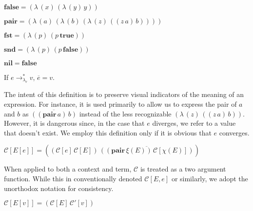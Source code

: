 \documentclass[ms,electronic,twosidetoc,letterpaper,chaptercenter,parttop]{byumsphd}
\newcommand{\true}{\mathbf{true}}
\newcommand{\false}{\mathbf{false}}
\newcommand{\nil}{\mathbf{nil}}
\newcommand{\pair}[2]{((\mathbf{pair}\,#1)\,#2)}
\newcommand{\eval}[1]{\overline{#1}}
\newcommand{\lvrrs}{\rightarrow_{\lambda_v}^{*}}
\newcommand{\C}[1]{\mathcal{C}[#1]}
\newcommand{\Ct}[2]{\mathcal{C}[#1,#2]}
\newcommand{\Cp}[1]{\mathcal{C}'[#1]}
\newcommand{\abs}[2]{(\lambda\,(#1)\,#2)}
\newcommand{\app}[2]{(#1\,#2)}
\begin{document}
\begin{defn}
$\false=\abs{x}{\abs{y}{y}}$
\end{defn}

\begin{defn}
$\mathbf{pair}=\abs{a}{\abs{b}{\abs{z}{\app{\app{z}{a}}{b}}}}$
\end{defn}

\begin{defn}
$\mathbf{fst}=\abs{p}{\app{p}{\true}}$
\end{defn}

\begin{defn}
$\mathbf{snd}=\abs{p}{\app{p}{\false}}$
\end{defn}

\begin{defn}
$\nil=\false$
\end{defn}

\begin{defn}
If $e\lvrrs v$, $\eval{e}=v$.

The intent of this definition is to preserve visual indicators of the meaning of an
expression. For instance, it is used primarily to allow us to express the pair of $a$ and
$b$ as $\eval{\pair{a}{b}}$ instead of the less recognizable
$\abs{z}{\app{\app{z}{a}}{b}}$. However, it is dangerous since, in the case that $e$
diverges, we refer to a value that doesn't exist. We employ this definition only if it is
obvious that $e$ converges.
\end{defn}

\begin{defn}
$\C{E[e]}=\app{\app{\C{e}}{\C{E}}}{\eval{\pair{\xi(E)}{\C{\chi(E)}}}}$

When applied to both a context and term, $\mathcal{C}$ is treated as a two argument
function. While this in conventionally denoted $\Ct{E}{e}$ or similarly, we adopt the
unorthodox notation for consistency.
\end{defn}

\begin{defn}
$\C{E[v]}=\app{\C{E}}{\Cp{v}}$
\end{defn}

\newenvironment{schemedefn}[1]{\begin{defn}$#1$\begin{singlespace}}{\end{singlespace}\end{defn}}
\newenvironment{namedschemedefn}[2]{\begin{defn}\label{#1}$#2$\begin{singlespace}}{\end{singlespace}\end{defn}}
\end{document}

